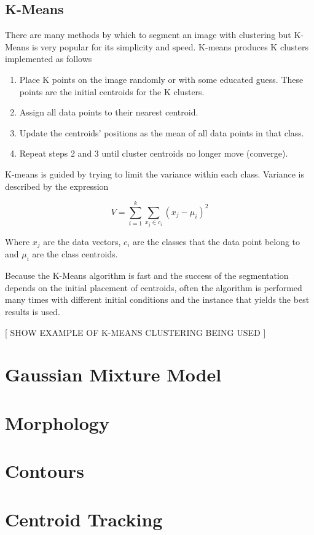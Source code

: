\subsection{K-Means}
There are many methods by which to segment an image with clustering but K-Means is very popular for its simplicity and speed. K-means produces K clusters implemented as follows

    \begin{enumerate}
    \itemsep0em
        \item Place K points on the image randomly or with some educated guess. These points are the initial centroids for the K clusters.  
        \item Assign all data points to their nearest centroid.
        \item Update the centroids' positions as the mean of all data points in that class.
        \item Repeat steps 2 and 3 until cluster centroids no longer move (converge). 
    \end{enumerate}

K-means is guided by trying to limit the variance within each class. Variance is described by the expression

\begin{equation}\label{eq:2}
   V = \sum_{i=1}^k\sum_{x_j\in c_i}(x_j-\mu_i)^2 
\end{equation}

Where {$x_j$} are the data vectors, $c_i$ are the classes that the data point belong to and $\mu_i$ are the class centroids.

Because the K-Means algorithm is fast and the success of the segmentation depends on the initial placement of centroids, often the algorithm is performed many times with different initial conditions and the instance that yields the best results is used. 


[ SHOW EXAMPLE OF K-MEANS CLUSTERING BEING USED ]
\section{Gaussian Mixture Model}


\section{Morphology}

\section{Contours}

\section{Centroid Tracking}


